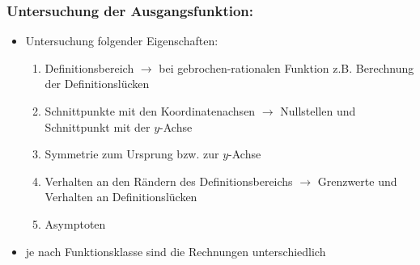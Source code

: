  \subsubsection{Untersuchung der Ausgangsfunktion:}
 \begin{itemize}
     \item Untersuchung folgender Eigenschaften:\\
     \begin{enumerate}
         \item Definitionsbereich $\longrightarrow$ bei gebrochen-rationalen Funktion z.B. Berechnung der Definitionslücken\\
         \item Schnittpunkte mit den Koordinatenachsen $\longrightarrow$ Nullstellen und Schnittpunkt mit der $y$-Achse\\
         \item Symmetrie zum Ursprung bzw. zur $y$-Achse\\
         \item Verhalten an den Rändern des Definitionsbereichs $\longrightarrow$ Grenzwerte und Verhalten an Definitionslücken\\
         \item Asymptoten
     \end{enumerate}
     \item je nach Funktionsklasse sind die Rechnungen unterschiedlich
 \end{itemize}
